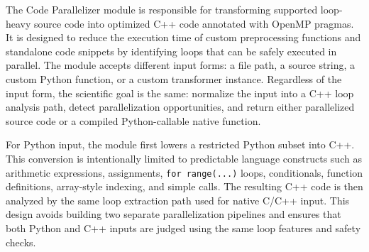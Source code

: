 The Code Parallelizer module is responsible for transforming supported
loop-heavy source code into optimized C++ code annotated with OpenMP pragmas. It
is designed to reduce the execution time of custom preprocessing functions and
standalone code snippets by identifying loops that can be safely executed in
parallel. The module accepts different input forms: a file path, a source string,
a custom Python function, or a custom transformer instance. Regardless of the
input form, the scientific goal is the same: normalize the input into a C++ loop
analysis path, detect parallelization opportunities, and return either
parallelized source code or a compiled Python-callable native function.

For Python input, the module first lowers a restricted Python subset into C++.
This conversion is intentionally limited to predictable language constructs such
as arithmetic expressions, assignments, \texttt{for range(...)} loops,
conditionals, function definitions, array-style indexing, and simple calls. The
resulting C++ code is then analyzed by the same loop extraction path used for
native C/C++ input. This design avoids building two separate parallelization
pipelines and ensures that both Python and C++ inputs are judged using the same
loop features and safety checks.
